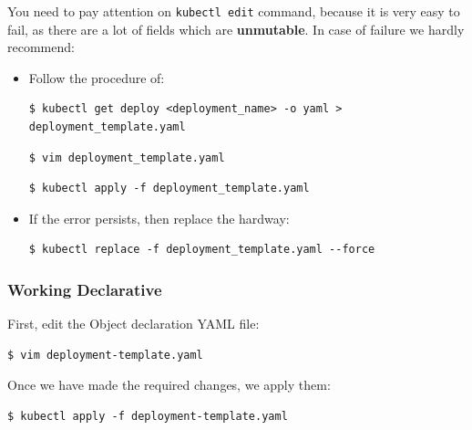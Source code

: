 \documentclass{article}
\newenvironment{blocktemplateIII}[1]{%
    \tcolorbox[beamer,%
    noparskip,breakable,
    ,colframe=Red,%
    colbacklower=LimeGreen!75!LightGreen,%
    title=#1]}%
    {\endtcolorbox}
\newenvironment{codetemplate}[1][]{%
  \mybasecolorbox[#1]
  \itshape
}{%
  \endmybasecolorbox
}
\begin{document}
\begin{blocktemplateIII}{WARNING}
You need to pay attention on \verb|kubectl edit| command, because it is very easy to fail, as there are a lot of fields which are \textbf{unmutable}. In case of failure we hardly recommend:
\begin{itemize}
    \item Follow the procedure of:
\begin{codetemplate}{}
\begin{verbatim}
$ kubectl get deploy <deployment_name> -o yaml > deployment_template.yaml
\end{verbatim}
\end{codetemplate}
\begin{codetemplate}{}
\begin{verbatim}
$ vim deployment_template.yaml
\end{verbatim}
\end{codetemplate}
\begin{codetemplate}{}
\begin{verbatim}
$ kubectl apply -f deployment_template.yaml
\end{verbatim}
\end{codetemplate}

    \item If the error persists, then replace the hardway:
\begin{codetemplate}{}
\begin{verbatim}
$ kubectl replace -f deployment_template.yaml --force
\end{verbatim}
\end{codetemplate}
\end{itemize}
\end{blocktemplateIII}

\subsubsection{Working Declarative}

First, edit the Object declaration YAML file:
\begin{codetemplate}{}
\begin{verbatim}
$ vim deployment-template.yaml
\end{verbatim}
\end{codetemplate}

Once we have made the required changes, we apply them:
\begin{codetemplate}{}
\begin{verbatim}
$ kubectl apply -f deployment-template.yaml
\end{verbatim}
\end{codetemplate}
\end{document}
